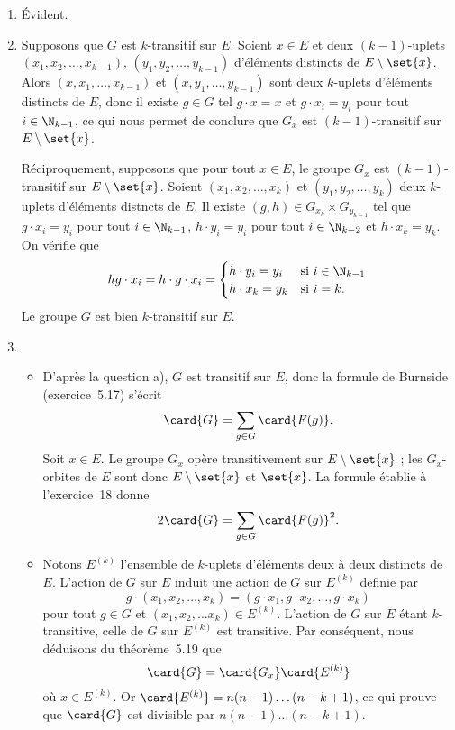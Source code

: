 \begin{enumerate}
  \item %
    Évident.

  \item %
    Supposons que $G$ est $k$-transitif sur $E$.
    Soient $x\in E$ et deux $(k - 1)$-uplets $(x_1, x_2, \dots, x_{k - 1})$, $(y_1, y_2, \dots, y_{k - 1})$ d'éléments distincts de $E \setminus\set{x}$.
    Alors $(x, x_1, \dots, x_{k - 1})$ et $(x, y_1, \dots, y_{k - 1})$ sont deux $k$-uplets d'éléments distincts de $E$, donc il existe $g\in G$ tel $g\cdot x = x$ et $g\cdot x_i = y_i$ pour tout $i\in\N_{k - 1}$, ce qui nous permet de conclure que $G_x$ est $(k - 1)$-transitif sur $E\setminus\set{x}$.

    Réciproquement, supposons que pour tout $x\in E$, le groupe $G_x$ est $(k - 1)$-transitif sur $E\setminus\set{x}$.
    Soient $(x_1, x_2, \dots, x_k)$ et $(y_1, y_2, \dots, y_k)$ deux $k$-uplets d'éléments distncts de $E$.
    Il existe $(g, h)\in G_{x_k}\times G_{y_{k - 1}}$ tel que $g\cdot x_i = y_i$ pour tout $i\in\N_{k - 1}$, $h\cdot y_i = y_i$ pour tout $i\in\N_{k - 2}$ et $h\cdot x_k = y_k$.
    On vérifie que
    \[
      hg\cdot x_i = h\cdot g\cdot x_i =
        \begin{cases}
          h\cdot y_i = y_i & \text{si $i\in\N_{k - 1}$} \\
          h\cdot x_k = y_k & \text{si $i = k$}.
        \end{cases}
    \]
    Le groupe $G$ est bien $k$-transitif sur $E$.

  \item %
    \begin{itemize}
      \item
        D'après la question a), $G$ est transitif sur $E$, donc la formule de Burnside (exercice~5.17) s'écrit
        \[
          \card{G} = \sum_{g\in G} \card{F(g)}.
        \]
        Soit $x\in E$.
        Le groupe $G_x$ opère transitivement sur $E\setminus\set{x}$ ; les $G_x$-orbites de $E$ sont donc $E\setminus\set{x}$ et $\set{x}$.
        La formule établie à l'exercice~18 donne
        \[
          2\card{G} = \sum_{g\in G} \card{F(g)}^2.
        \]
      \item
        Notons $E^{(k)}$ l'ensemble de $k$-uplets d'éléments deux à deux distincts de $E$.
        L'action de $G$ sur $E$ induit une action de $G$ sur $E^{(k)}$ definie par
        \[
          g\cdot(x_1, x_2, \dots, x_k) = (g\cdot x_1, g\cdot x_2, \dots, g\cdot x_k)
        \]
        pour tout $g\in G$ et $(x_1, x_2, \dots x_k)\in E^{(k)}$.
        L'action de $G$ sur $E$ étant $k$-transitive, celle de $G$ sur $E^{(k)}$ est transitive.
        Par conséquent, nous déduisons du théorème~5.19 que
        \[
          \card{G} = \card{G_x} \card{E^{(k)}}
        \]
        où $x\in E^{(k)}$.
        Or $\card{E^{(k)}} = n(n - 1)\dots (n - k + 1)$, ce qui prouve que $\card{G}$ est divisible par $n(n - 1)\dots (n - k + 1)$.

    \end{itemize}

\end{enumerate}
